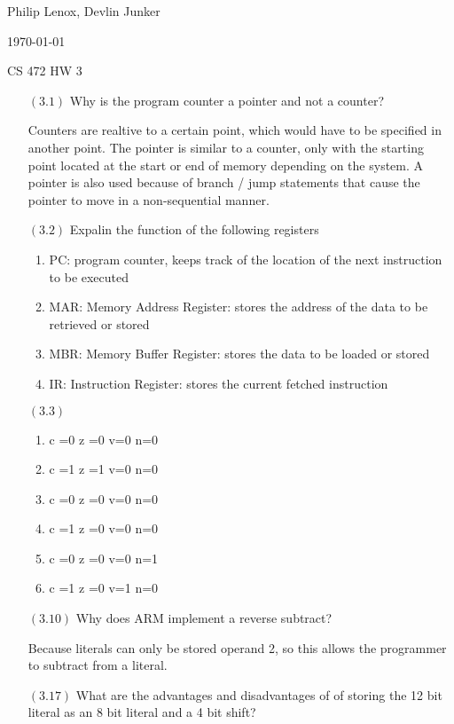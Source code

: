 \documentclass[letterpaper,10pt,titlepage]{article}
\def\name{Philip Lenox, Devlin Junker}
\begin{document}
\hfill \name

\hfill \today

\hfill CS 472 HW 3

\begin{enumerate}



\item[$(3.1)$]Why is the program counter a pointer and not a counter?
	 
	 Counters are realtive to a certain point, which would have to be specified in another point. The pointer is similar to a counter, only with the starting point located at the start or end of memory depending on the system. A pointer is also used because of branch / jump statements that cause the pointer to move in a non-sequential manner.
	
\item[$(3.2)$]Expalin the function of the following registers

\begin{enumerate}
\item PC: program counter, keeps track of the location of the next instruction to be executed
\item MAR: Memory Address Register: stores the address of the data to be retrieved or stored
\item MBR: Memory Buffer Register: stores the data to be loaded or stored
\item IR: Instruction Register: stores the current fetched instruction 
\end{enumerate}

\item[$(3.3)$]

\begin{enumerate}
\item c =0 z =0 v=0 n=0
\item c =1 z =1 v=0 n=0
\item c =0 z =0 v=0 n=0
\item c =1 z =0 v=0 n=0
\item c =0 z =0 v=0 n=1
\item c =1 z =0 v=1 n=0
\end{enumerate}

\item[$(3.10)$]Why does ARM implement a reverse subtract?

Because literals can only be stored operand 2, so this allows the programmer to subtract from a literal.
\item[$(3.17)$]What are the advantages and disadvantages of of storing the 12 bit literal as an 8 bit literal and a 4 bit shift?


\end{enumerate}
\end{document}
